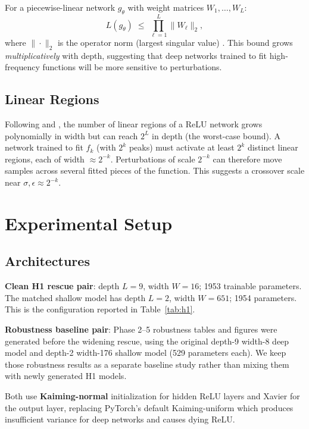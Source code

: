 \documentclass[10pt,twocolumn]{article}
\begin{document}
For a piecewise-linear network $g_\theta$ with weight matrices $W_1, \ldots, W_L$:
\begin{equation}
  L(g_\theta) \;\leq\; \prod_{\ell=1}^{L} \|W_\ell\|_2,
\end{equation}
where $\|\cdot\|_2$ is the operator norm (largest singular value)
\citep{bartlett2017spectrally, sokolic2017robust}.
This bound grows \emph{multiplicatively} with depth, suggesting that deep networks
trained to fit high-frequency functions will be more sensitive to perturbations.

\subsection{Linear Regions}

Following \citet{montufar2014number} and \citet{hanin2019deep}, the number of linear
regions of a ReLU network grows polynomially in width but can reach $2^{L}$ in depth
(the worst-case bound). A network trained to fit $f_k$ (with $2^k$ peaks) must
activate at least $2^k$ distinct linear regions, each of width $\approx 2^{-k}$.
Perturbations of scale $2^{-k}$ can therefore move samples across several fitted
pieces of the function. This suggests a crossover scale near
$\sigma, \epsilon \approx 2^{-k}$.

\section{Experimental Setup}
\label{sec:setup}

\subsection{Architectures}

\textbf{Clean H1 rescue pair}: depth $L=9$, width $W=16$; 1953 trainable parameters.
The matched shallow model has depth $L=2$, width $W=651$; 1954 parameters. This
is the configuration reported in Table~\ref{tab:h1}.

\textbf{Robustness baseline pair}: Phase 2--5 robustness tables and figures were
generated before the widening rescue, using the original depth-9 width-8 deep model
and depth-2 width-176 shallow model (529 parameters each). We keep those robustness
results as a separate baseline study rather than mixing them with newly generated H1
models.

Both use \textbf{Kaiming-normal} initialization for hidden ReLU layers and Xavier for
the output layer, replacing PyTorch's default Kaiming-uniform which produces insufficient
variance for deep networks and causes dying ReLU.
\end{document}
